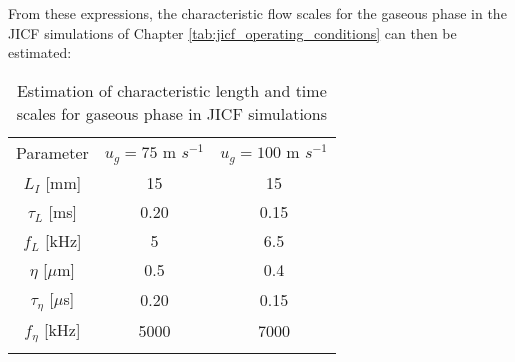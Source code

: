 From these expressions, the characteristic flow scales for the gaseous phase in the JICF simulations of Chapter \ref{tab:jicf_operating_conditions} can then be estimated:

\begin{table}[!h]
\centering
\caption{Estimation of characteristic length and time scales for gaseous phase in JICF simulations}
\begin{tabular}{ccc}
\thickhline
Parameter &  $u_g = 75$ m $s^{-1}$ &  $u_g = 100$ m $s^{-1}$ \\ 
\thickhline
$L_I$ [mm] & 15 & 15 \\
$\tau_L$ [ms] & 0.20 & 0.15 \\
$f_L$ [kHz] & 5 & 6.5 \\
\thickhline
$\eta$ [$\mu$m] & 0.5 & 0.4 \\
$\tau_\eta$ [$\mu$s] & 0.20 & 0.15 \\
$f_\eta$ [kHz] & 5000 & 7000 \\
\thickhline
\end{tabular}
\label{tab:jicf_velocity_profiles_parameters}
\end{table}